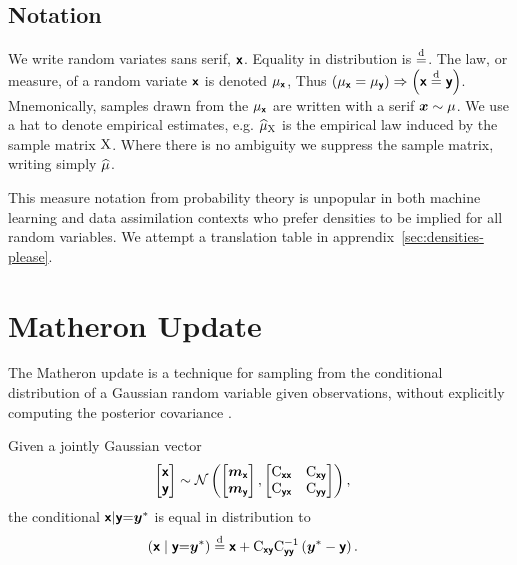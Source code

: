 \documentclass[wcp]{jmlr} %
\begin{document}
\subsection{Notation}

We write random variates sans serif, $\boldsymbol{\mathsf{x}}$.
Equality in distribution is $\stackrel{\mathrm{d}}{=}$.
The law, or measure, of a random variate $\boldsymbol{\mathsf{x}}$ is denoted $\Law[\vrv{x}]$,
Thus $\left(\Law[\vrv{x}]=\Law[\vrv{y}]\right) \Rightarrow \left(\vrv{x}\disteq\vrv{y}\right)$.
Mnemonically, samples drawn from the $\Law[\vrv{x}]$ are written with a serif $\vv{x}\sim\Law$.
We use a hat to denote empirical estimates, e.g. \(\ELaw[\mm{X}]\) is the empirical law induced by the sample matrix \(\mathrm{X}\).
Where there is no ambiguity we suppress the sample matrix, writing simply \(\widehat{\Law}\).

This measure notation from probability theory is unpopular in both machine learning and data assimilation contexts who prefer densities to be implied for all random variables.
We attempt a translation table in apprendix~\ref{sec:densities-please}.

\section{Matheron Update}

The Matheron update is a technique for sampling from the conditional distribution of a Gaussian random variable given observations, without explicitly computing the posterior covariance \citep{Doucet2010Note,Wilson2020Efficiently,Wilson2021Pathwise}.

\begin{lemma}
Given a jointly Gaussian vector
\begin{align}
    \begin{bmatrix} \boldsymbol{\mathsf{x}} \\ \boldsymbol{\mathsf{y}} \end{bmatrix}
    &\sim \mathcal{N}\left(\begin{bmatrix} \boldsymbol{m}_{\boldsymbol{\mathsf{x}}} \\ \boldsymbol{m}_{\boldsymbol{\mathsf{y}}} \end{bmatrix}, \begin{bmatrix} \mathrm{C}_{\boldsymbol{\mathsf{xx}}} & \mathrm{C}_{\boldsymbol{\mathsf{xy}}} \\ \mathrm{C}_{\boldsymbol{\mathsf{yx}}} & \mathrm{C}_{\boldsymbol{\mathsf{yy}}} \end{bmatrix}\right), \label{eq:joint-gaussian}
\end{align}
the conditional $\boldsymbol{\mathsf{x}} | \boldsymbol{\mathsf{y}} {=} \boldsymbol{y}^*$ is equal in distribution to
\begin{align}
    \left(\boldsymbol{\mathsf{x}} \mid \boldsymbol{\mathsf{y}} {=} \boldsymbol{y}^*\right)
    &\stackrel{\mathrm{d}}{=} \boldsymbol{\mathsf{x}} + \mathrm{C}_{\boldsymbol{\mathsf{xy}}} \mathrm{C}_{\boldsymbol{\mathsf{yy}}}^{-1} \left( \boldsymbol{y}^* - \boldsymbol{\mathsf{y}} \right).
    \label{eq:matheron-update}
\end{align}
\end{lemma}
\end{document}
